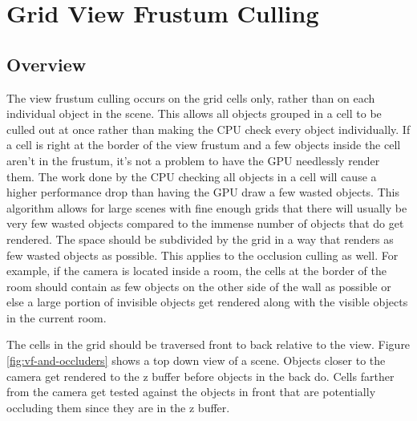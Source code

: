 \documentclass[12pt]{ucthesis}
\begin{document}
\section{Grid View Frustum Culling}
\label{grid-view-frustum-culling}

\subsection{Overview}
\label{Overview}
The view frustum culling occurs on the grid cells only, rather than on each individual object in the scene.
This allows all objects grouped in a cell to be culled out at once rather than making the CPU check every object individually.
If a cell is right at the border of the view frustum and a few objects inside the cell aren't in the frustum, it's not a problem to have the GPU needlessly render them.
The work done by the CPU checking all objects in a cell will cause a higher performance drop than having the GPU draw a few wasted objects.
This algorithm allows for large scenes with fine enough grids that there will usually be very few wasted objects compared to the immense number of objects that do get rendered.
The space should be subdivided by the grid in a way that renders as few wasted objects as possible.
This applies to the occlusion culling as well.
For example, if the camera is located inside a room, the cells at the border of the room should contain as few objects on the other side of the wall as possible or else a large portion of invisible objects get rendered along with the visible objects in the current room.

The cells in the grid should be traversed front to back relative to the view.
Figure \ref{fig:vf-and-occluders} shows a top down view of a scene.
Objects closer to the camera get rendered to the z buffer before objects in the back do.
Cells farther from the camera get tested against the objects in front that are potentially occluding them since they are in the z buffer.
\end{document}
